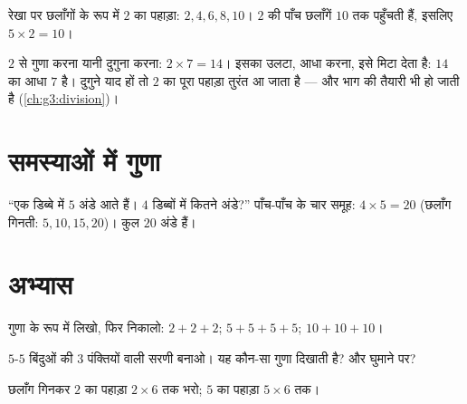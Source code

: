\begin{omfigure}

{\small रेखा पर छलाँगों के रूप में $2$ का पहाड़ा: $2, 4, 6, 8, 10$।
$2$ की पाँच छलाँगें $10$ तक पहुँचती हैं, इसलिए $5 \times 2 = 10$।}
\end{omfigure}

\begin{example}[दुगुना और आधा]\label{ex:g2:mult:double}
$2$ से गुणा करना यानी दुगुना करना: $2 \times 7 = 14$। इसका उलटा,
आधा करना, इसे मिटा देता है: $14$ का आधा $7$ है। दुगुने याद हों
तो $2$ का पूरा पहाड़ा तुरंत आ जाता है --- और भाग की तैयारी भी
हो जाती है (\cref{ch:g3:division})।
\end{example}

\section{समस्याओं में गुणा}

\begin{example}\label{ex:g2:mult:problem}
``एक डिब्बे में $5$ अंडे आते हैं। $4$ डिब्बों में कितने अंडे?''
पाँच-पाँच के चार समूह: $4 \times 5 = 20$ (छलाँग गिनती:
$5, 10, 15, 20$)। कुल $20$ अंडे हैं।
\end{example}

\section{अभ्यास}

\begin{exercise}[$\star$]\label{exo:g2:mult:1}
गुणा के रूप में लिखो, फिर निकालो: $2 + 2 + 2$; \quad
$5 + 5 + 5 + 5$; \quad $10 + 10 + 10$।
\end{exercise}

\begin{exercise}[$\star$]\label{exo:g2:mult:2}
$5$-$5$ बिंदुओं की $3$ पंक्तियों वाली सरणी बनाओ। यह कौन-सा गुणा
दिखाती है? और घुमाने पर?
\end{exercise}

\begin{exercise}[$\star$]\label{exo:g2:mult:3}
छलाँग गिनकर $2$ का पहाड़ा $2 \times 6$ तक भरो; $5$ का पहाड़ा
$5 \times 6$ तक।
\end{exercise}

